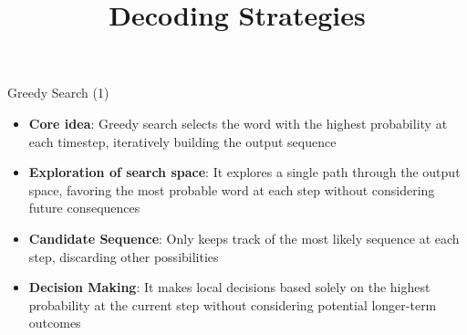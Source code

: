 



\newcommand{\learninggoals}{
\item Get to know deterministic decoding strategies
\item Learn how text is generated with greedy search and beam search
\item Understand how beam search tries to fix the drawbacks of greedy search
}
\def\myblue#1{\textcolor{texblue}{#1}}

\title{Decoding Strategies}
\date{}




\begin{vbframe}{Greedy Search (1)}
\href{https://codelabsacademy.com/blog/the-beam-search-algorithm-in-the-context-of-natural-language-processing-and-sequence-generation-tasks}{}
\vfill

\begin{itemize}
    \item \textbf{Core idea}: Greedy search selects the word with the highest probability at each timestep, iteratively building the output sequence
    \item \textbf{Exploration of search space}: It explores a single path through the output space, favoring the most probable word at each step without considering future consequences
    \item \textbf{Candidate Sequence}: Only keeps track of the most likely sequence at each step, discarding other possibilities
    \item \textbf{Decision Making}: It makes local decisions based solely on the highest probability at the current step without considering potential longer-term outcomes
\end{itemize}

\vfill
    
\end{vbframe}


